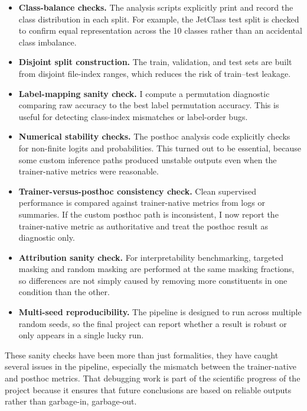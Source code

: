 \documentclass[10pt]{article}
\begin{document}
\begin{itemize}[leftmargin=*]
\item \textbf{Class-balance checks.} The analysis scripts explicitly print and record the class distribution in each split. For example, the JetClass test split is checked to confirm equal representation across the 10 classes rather than an accidental class imbalance.

\item \textbf{Disjoint split construction.} The train, validation, and test sets are built from disjoint file-index ranges, which reduces the risk of train--test leakage.

\item \textbf{Label-mapping sanity check.} I compute a permutation diagnostic comparing raw accuracy to the best label permutation accuracy. This is useful for detecting class-index mismatches or label-order bugs.

\item \textbf{Numerical stability checks.} The posthoc analysis code explicitly checks for non-finite logits and probabilities. This turned out to be essential, because some custom inference paths produced unstable outputs even when the trainer-native metrics were reasonable.

\item \textbf{Trainer-versus-posthoc consistency check.} Clean supervised performance is compared against trainer-native metrics from logs or summaries. If the custom posthoc path is inconsistent, I now report the trainer-native metric as authoritative and treat the posthoc result as diagnostic only.

\item \textbf{Attribution sanity check.} For interpretability benchmarking, targeted masking and random masking are performed at the same masking fractions, so differences are not simply caused by removing more constituents in one condition than the other.

\item \textbf{Multi-seed reproducibility.} The pipeline is designed to run across multiple random seeds, so the final project can report whether a result is robust or only appears in a single lucky run.
\end{itemize}


These sanity checks have been more than just formalities, they have caught several issues in the pipeline, especially the mismatch between the trainer-native and posthoc metrics. That debugging work is part of the scientific progress of the project because it ensures that future conclusions are based on reliable outputs rather than garbage-in, garbage-out.
\end{document}
